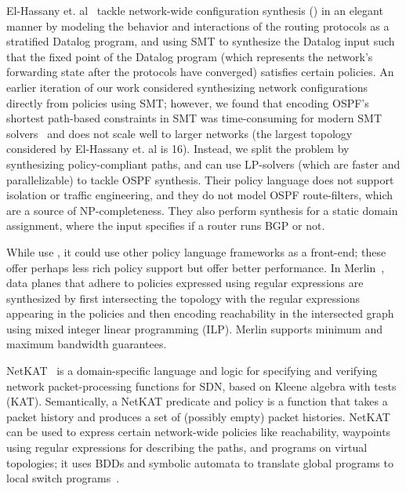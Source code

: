 El-Hassany et. al~\cite{synet} tackle network-wide configuration
synthesis () in an elegant manner by
modeling the behavior and interactions of the routing protocols as a
stratified Datalog program, and using SMT to synthesize the Datalog
input such that the fixed point of the Datalog program (which
represents the network's forwarding state after the protocols have
converged) satisfies certain policies.  An earlier iteration of our
work considered synthesizing network configurations directly from
policies using SMT; however, we found that encoding OSPF's shortest
path-based constraints in SMT was time-consuming for modern SMT
solvers~\cite{z3} and does not scale well to larger networks (the
largest topology considered by El-Hassany et. al is 16). Instead, we
split the problem by synthesizing policy-compliant paths, and can use
LP-solvers (which are faster and parallelizable) to tackle OSPF
synthesis.  Their policy language does not support isolation or
traffic engineering, and they do not model OSPF route-filters, which
are a source of NP-completeness.  They also perform synthesis for a
static domain assignment, where the input specifies if a router runs
BGP or not.

 While \name use \genesis, it could use
other policy language frameworks as a front-end; these offer perhaps
less rich policy support but offer better performance. %
In Merlin~\cite{merlin}, data planes that adhere to policies expressed
using regular expressions are synthesized by first intersecting the
topology with the regular expressions appearing in the policies and
then encoding reachability in the intersected graph using mixed
integer linear programming (ILP).  Merlin supports minimum and maximum
bandwidth guarantees.

NetKAT~\cite{netkat} is a domain-specific language and logic for 
specifying and verifying network packet-processing functions
for SDN, based on Kleene algebra with tests (KAT). Semantically,
a NetKAT predicate and policy is a function that takes a packet
history and produces a set of (possibly empty) packet histories. 
NetKAT can be used to express certain network-wide policies like 
reachability, waypoints using regular expressions for describing the paths, 
and programs on virtual topologies; it uses
BDDs and symbolic automata to translate global programs to local
switch programs~\cite{netkatcompiler}.

